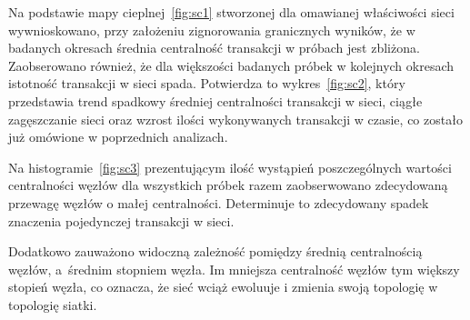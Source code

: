 \documentclass[12pt, oneside, final, openany]{mgr}
\begin{document}
\indent Na podstawie mapy cieplnej~\ref{fig:sc1} stworzonej dla omawianej właściwości sieci wywnioskowano, przy założeniu zignorowania granicznych wyników, że w badanych okresach średnia centralność transakcji w próbach jest zbliżona. Zaobserowano również, że dla większości badanych próbek w kolejnych okresach istotność transakcji w sieci spada. Potwierdza to wykres~\ref{fig:sc2}, który przedstawia trend spadkowy średniej centralności transakcji w sieci, ciągłe zagęszczanie sieci oraz wzrost ilości wykonywanych transakcji w czasie, co zostało już omówione w poprzednich analizach.

\indent Na histogramie~\ref{fig:sc3} prezentującym ilość wystąpień poszczególnych wartości centralności węzłów dla wszystkich próbek razem zaobserwowano zdecydowaną przewagę węzłów o małej centralności. Determinuje to zdecydowany spadek znaczenia pojedynczej transakcji w sieci.

\indent Dodatkowo zauważono widoczną zależność pomiędzy średnią centralnością węzłów, a~średnim stopniem węzła. Im mniejsza centralność węzłów tym większy stopień węzła, co oznacza, że sieć wciąż ewoluuje i zmienia swoją topologię w topologię siatki. 
\end{document}

